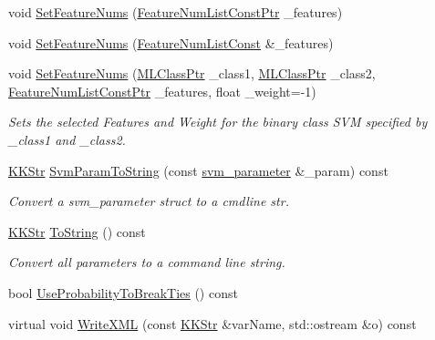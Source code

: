 \begin{DoxyCompactItemize}
\item 
void \hyperlink{class_k_k_m_l_l_1_1_s_v_mparam_aabbd229c11a37f4d76e2da5135bf148e}{Set\+Feature\+Nums} (\hyperlink{namespace_k_k_m_l_l_a81284b0a14973267260023f9a72da94a}{Feature\+Num\+List\+Const\+Ptr} \+\_\+features)
\item 
void \hyperlink{class_k_k_m_l_l_1_1_s_v_mparam_a54ccb20e0f61d61f1e642227df4e3e2e}{Set\+Feature\+Nums} (\hyperlink{namespace_k_k_m_l_l_ad276a9ed309552a63300bce930bdfebd}{Feature\+Num\+List\+Const} \&\+\_\+features)
\item 
void \hyperlink{class_k_k_m_l_l_1_1_s_v_mparam_aaa64f049d7e527b6b0402932972e211f}{Set\+Feature\+Nums} (\hyperlink{namespace_k_k_m_l_l_ac272393853d59e72e8456f14cd6d8c23}{M\+L\+Class\+Ptr} \+\_\+class1, \hyperlink{namespace_k_k_m_l_l_ac272393853d59e72e8456f14cd6d8c23}{M\+L\+Class\+Ptr} \+\_\+class2, \hyperlink{namespace_k_k_m_l_l_a81284b0a14973267260023f9a72da94a}{Feature\+Num\+List\+Const\+Ptr} \+\_\+features, float \+\_\+weight=-\/1)
\begin{DoxyCompactList}\small\item\em Sets the selected Features and Weight for the binary class S\+VM specified by \+\_\+class1 and \+\_\+class2. \end{DoxyCompactList}\item 
\hyperlink{class_k_k_b_1_1_k_k_str}{K\+K\+Str} \hyperlink{class_k_k_m_l_l_1_1_s_v_mparam_a2c79ac20378aedbddf889c356bc3f1bf}{Svm\+Param\+To\+String} (const \hyperlink{struct_s_v_m233_1_1svm__parameter}{svm\+\_\+parameter} \&\+\_\+param) const 
\begin{DoxyCompactList}\small\item\em Convert a svm\+\_\+parameter struct to a cmdline str. \end{DoxyCompactList}\item 
\hyperlink{class_k_k_b_1_1_k_k_str}{K\+K\+Str} \hyperlink{class_k_k_m_l_l_1_1_s_v_mparam_a92293ae68a65e26cd73d2c973a2246f0}{To\+String} () const 
\begin{DoxyCompactList}\small\item\em Convert all parameters to a command line string. \end{DoxyCompactList}\item 
bool \hyperlink{class_k_k_m_l_l_1_1_s_v_mparam_a2da6c5858675cfd9db51e50f548d5f46}{Use\+Probability\+To\+Break\+Ties} () const 
\item 
virtual void \hyperlink{class_k_k_m_l_l_1_1_s_v_mparam_a1c5b624f8e72edde7bbe2c48f3b5af8e}{Write\+X\+ML} (const \hyperlink{class_k_k_b_1_1_k_k_str}{K\+K\+Str} \&var\+Name, std\+::ostream \&o) const 
\end{DoxyCompactItemize}


